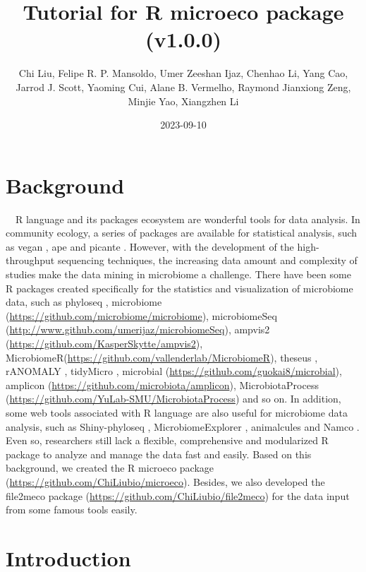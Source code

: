 \documentclass[
]{book}
\title{Tutorial for R microeco package (v1.0.0)}
\author{Chi Liu, Felipe R. P. Mansoldo, Umer Zeeshan Ijaz, Chenhao Li, Yang Cao, Jarrod J. Scott, Yaoming Cui, Alane B. Vermelho, Raymond Jianxiong Zeng, Minjie Yao, Xiangzhen Li}
\date{2023-09-10}
\begin{document}
\maketitle

{
\setcounter{tocdepth}{1}
\tableofcontents
}
\hypertarget{background}{%
\chapter{Background}\label{background}}

　R language \citep{R-base} and its packages ecosystem are wonderful tools for data analysis.
In community ecology, a series of packages are available for statistical analysis,
such as vegan \citep{Jari_vegan_2019}, ape \citep{Paradis_ape_2018} and picante \citep{Picante_Kembel_2010}.
However, with the development of the high-throughput sequencing techniques,
the increasing data amount and complexity of studies make the data mining in microbiome a challenge.
There have been some R packages created specifically for the statistics and visualization of microbiome data,
such as phyloseq \citep{Mcmurdie_phyloseq_2013},
microbiome (\url{https://github.com/microbiome/microbiome}), microbiomeSeq (\url{http://www.github.com/umerijaz/microbiomeSeq}),
ampvis2 (\url{https://github.com/KasperSkytte/ampvis2}), MicrobiomeR(\url{https://github.com/vallenderlab/MicrobiomeR}),
theseus \citep{Price_theseus_2018}, rANOMALY \citep{Theil_rANOMALY_2021},
tidyMicro \citep{Carpenter_tidyMicro_2021}, microbial (\url{https://github.com/guokai8/microbial}),
amplicon (\url{https://github.com/microbiota/amplicon}),
MicrobiotaProcess (\url{https://github.com/YuLab-SMU/MicrobiotaProcess})
and so on.
In addition, some web tools associated with R language are also useful for microbiome data analysis,
such as Shiny-phyloseq \citep{McMurdie_Shiny_2015}, MicrobiomeExplorer \citep{Reeder_MicrobiomeExplorer_2021},
animalcules \citep{Zhao_animalcules_2021} and Namco \citep{Dietrich_Namco_2022}.
Even so, researchers still lack a flexible, comprehensive and modularized R package to analyze and manage the data fast and easily.
Based on this background, we created the R microeco package \citep{Liu_microeco_2021} (\url{https://github.com/ChiLiubio/microeco}).
Besides, we also developed the file2meco package (\url{https://github.com/ChiLiubio/file2meco}) for the data input from some famous tools easily.

\hypertarget{intro}{%
\chapter{Introduction}\label{intro}}
\end{document}
